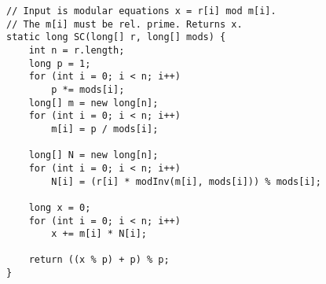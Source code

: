 \begin{verbatim}
// Input is modular equations x = r[i] mod m[i].
// The m[i] must be rel. prime. Returns x.
static long SC(long[] r, long[] mods) {
	int n = r.length;
	long p = 1;
	for (int i = 0; i < n; i++) 
		p *= mods[i];
	long[] m = new long[n];
	for (int i = 0; i < n; i++) 
		m[i] = p / mods[i];
		
	long[] N = new long[n];
	for (int i = 0; i < n; i++) 
		N[i] = (r[i] * modInv(m[i], mods[i])) % mods[i];
		
	long x = 0;
	for (int i = 0; i < n; i++) 
		x += m[i] * N[i];
		
	return ((x % p) + p) % p;
}
\end{verbatim}